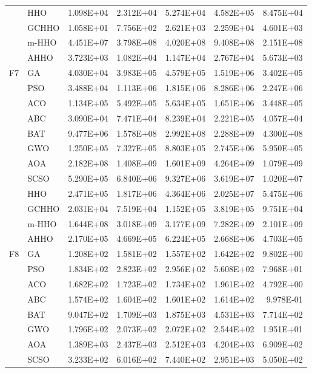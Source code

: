 \begin{longtable}{llrrrrr}
 & HHO & 1.098E+04 & 2.312E+04 & 5.274E+04 & 4.582E+05 & 8.475E+04 \\
 & GCHHO & 1.058E+01 & 7.756E+02 & 2.621E+03 & 2.259E+04 & 4.601E+03 \\
 & m-HHO & 4.451E+07 & 3.798E+08 & 4.020E+08 & 9.408E+08 & 2.151E+08 \\
 & AHHO & 3.723E+03 & 1.082E+04 & 1.147E+04 & 2.767E+04 & 5.673E+03 \\
\addlinespace
F7 & GA & 4.030E+04 & 3.983E+05 & 4.579E+05 & 1.519E+06 & 3.402E+05 \\
 & PSO & 3.488E+04 & 1.113E+06 & 1.815E+06 & 8.286E+06 & 2.247E+06 \\
 & ACO & 1.134E+05 & 5.492E+05 & 5.634E+05 & 1.651E+06 & 3.448E+05 \\
 & ABC & 3.090E+04 & 7.471E+04 & 8.239E+04 & 2.221E+05 & 4.057E+04 \\
 & BAT & 9.477E+06 & 1.578E+08 & 2.992E+08 & 2.288E+09 & 4.300E+08 \\
 & GWO & 1.250E+05 & 7.327E+05 & 8.803E+05 & 2.745E+06 & 5.950E+05 \\
 & AOA & 2.182E+08 & 1.408E+09 & 1.601E+09 & 4.264E+09 & 1.079E+09 \\
 & SCSO & 5.290E+05 & 6.840E+06 & 9.327E+06 & 3.619E+07 & 1.020E+07 \\
 & HHO & 2.471E+05 & 1.817E+06 & 4.364E+06 & 2.025E+07 & 5.475E+06 \\
 & GCHHO & 2.031E+04 & 7.519E+04 & 1.152E+05 & 3.819E+05 & 9.751E+04 \\
 & m-HHO & 1.644E+08 & 3.018E+09 & 3.177E+09 & 7.282E+09 & 2.101E+09 \\
 & AHHO & 2.170E+05 & 4.669E+05 & 6.224E+05 & 2.668E+06 & 4.703E+05 \\
\addlinespace
F8 & GA & 1.208E+02 & 1.581E+02 & 1.557E+02 & 1.642E+02 & 9.802E+00 \\
 & PSO & 1.834E+02 & 2.823E+02 & 2.956E+02 & 5.608E+02 & 7.968E+01 \\
 & ACO & 1.682E+02 & 1.723E+02 & 1.734E+02 & 1.961E+02 & 4.792E+00 \\
 & ABC & 1.574E+02 & 1.604E+02 & 1.601E+02 & 1.614E+02 & 9.978E-01 \\
 & BAT & 9.047E+02 & 1.709E+03 & 1.875E+03 & 4.531E+03 & 7.714E+02 \\
 & GWO & 1.796E+02 & 2.073E+02 & 2.072E+02 & 2.544E+02 & 1.951E+01 \\
 & AOA & 1.389E+03 & 2.437E+03 & 2.512E+03 & 4.204E+03 & 6.909E+02 \\
 & SCSO & 3.233E+02 & 6.016E+02 & 7.440E+02 & 2.951E+03 & 5.050E+02 \\

\end{longtable}
